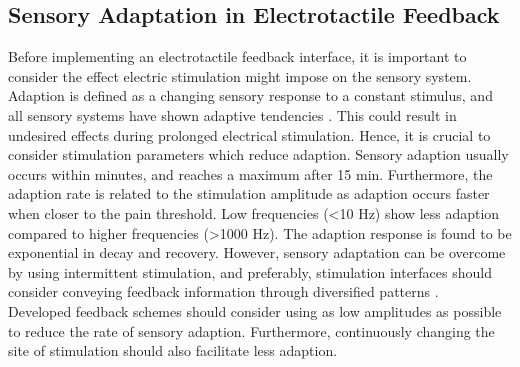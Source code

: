 \subsection{Sensory Adaptation in Electrotactile Feedback}

Before implementing an electrotactile feedback interface, it is important to consider the effect electric stimulation might impose on the sensory system. \\
Adaption is defined as a changing sensory response to a constant stimulus, and all sensory systems have shown adaptive tendencies \cite{Buma2007}. This could result in undesired effects during prolonged electrical stimulation. Hence, it is crucial to consider stimulation parameters which reduce adaption. Sensory adaption usually occurs within minutes, and reaches a maximum after 15 min. Furthermore, the adaption rate is related to the stimulation amplitude as adaption occurs faster when closer to the pain threshold. Low frequencies (<10 Hz) show less adaption compared to higher frequencies (>1000 Hz). The adaption response is found to be exponential in decay and recovery. \cite{Buma2007,Szeto1982} 
However, sensory adaptation can be overcome by using intermittent stimulation, and preferably, stimulation interfaces should consider conveying feedback information through diversified patterns \cite{Szeto1982,Dosen2016}. \\
Developed feedback schemes should consider using as low amplitudes as possible to reduce the rate of sensory adaption. Furthermore, continuously changing the site of stimulation should also facilitate less adaption. 



